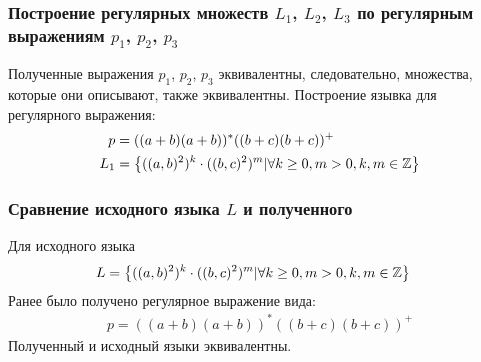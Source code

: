\subsubsection{Построение регулярных множеств \(L_1\), \(L_2\), \(L_3\) по регулярным выражениям \(p_1\), \(p_2\), \(p_3\)}
Полученные выражения \(p_1\), \(p_2\), \(p_3\) эквивалентны, следовательно, множества, которые они описывают, также эквивалентны. Построение язывка для регулярного выражения:
\begin{align*}
	p   & = ((a+b)(a+b))^* ((b+c)(b+c))^+                                                   \\
	L_1 & = \left\{((a,b)^2)^k\cdot((b,c)^2)^m| \forall k \geq 0, m > 0, k, m \in \mathbb{Z}\right\}
\end{align*}
\subsubsection{Сравнение исходного языка \(L\) и полученного}
Для исходного языка
\begin{align*}
	L & = \left\{((a,b)^2)^k\cdot((b,c)^2)^m| \forall k \geq 0, m > 0, k, m \in \mathbb{Z}\right\}
\end{align*}
Ранее было получено регулярное выражение вида:
\begin{align*}
	p = ((a+b)(a+b))^*((b+c)(b+c))^+
\end{align*}
Полученный и исходный языки эквивалентны.
